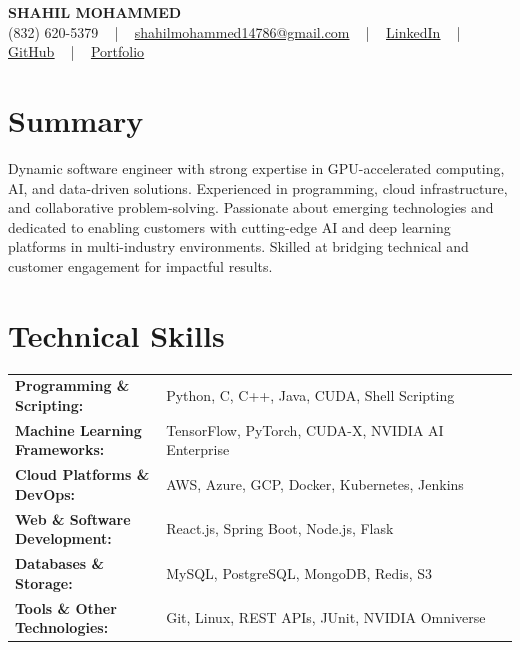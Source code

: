 \documentclass[letterpaper,11pt]{article}
\begin{document}
\begin{center}
    {\fontsize{14pt}{12pt}\selectfont \textbf{\MakeUppercase{Shahil Mohammed}}}\\ \vspace{2pt}
    \fontsize{10pt}{12pt}\selectfont (832) 620-5379 ~ | ~ \href{mailto:shahilmohammed14786@gmail.com}{shahilmohammed14786@gmail.com} ~ | ~  
    \href{https://www.linkedin.com/in/shahil-mohammed-9652931a1/}{\color{blue}\underline{LinkedIn}}  ~ | ~ 
    \href{https://github.com/freakbeast14}{\color{blue}\underline{GitHub}} ~ | ~ 
    \href{https://shahil-mohammed.netlify.app/}{\color{blue}\underline{Portfolio}}
    \vspace{-8pt}
\end{center}

\section{Summary}
\fontsize{9pt}{10pt}\selectfont
Dynamic software engineer with strong expertise in GPU-accelerated computing, AI, and data-driven solutions. Experienced in programming, cloud infrastructure, and collaborative problem-solving. Passionate about emerging technologies and dedicated to enabling customers with cutting-edge AI and deep learning platforms in multi-industry environments. Skilled at bridging technical and customer engagement for impactful results.
 \vspace{-5pt}
 
\section{Technical Skills}
        \vspace{-14pt}
        \begin{table}[h]
            \fontsize{9pt}{10pt}\selectfont
            \begin{tabular}{p{0.3\linewidth} p{0.7\linewidth}}
                \textbf{Programming \& Scripting:} & Python, C, C++, Java, CUDA, Shell Scripting \\
                \textbf{Machine Learning Frameworks:} & TensorFlow, PyTorch, CUDA-X, NVIDIA AI Enterprise \\
                \textbf{Cloud Platforms \& DevOps:} & AWS, Azure, GCP, Docker, Kubernetes, Jenkins \\
                \textbf{Web \& Software Development:} & React.js, Spring Boot, Node.js, Flask \\
                \textbf{Databases \& Storage:} & MySQL, PostgreSQL, MongoDB, Redis, S3 \\
                \textbf{Tools \& Other Technologies:} & Git, Linux, REST APIs, JUnit, NVIDIA Omniverse \\
            \end{tabular}
        \end{table}
 \vspace{-15pt}
 
\end{document}
